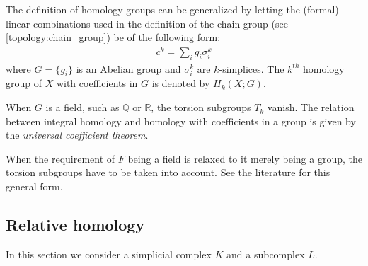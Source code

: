     \begin{construct}
        The definition of homology groups can be generalized by letting the (formal) linear combinations used in the definition of the chain group (see \ref{topology:chain_group}) be of the following form:
        \begin{gather}
            c^k = \sum_ig_i\sigma_i^k
        \end{gather}
        where $G = \{g_i\}$ is an Abelian group and $\sigma_i^k$ are $k$-simplices. The $k^{th}$ homology group of $X$ with coefficients in $G$ is denoted by $H_k(X; G)$.
    \end{construct}
    \begin{property}
        When $G$ is a field, such as $\mathbb{Q}$ or $\mathbb{R}$, the torsion subgroups $T_k$ vanish. The relation between integral homology and homology with coefficients in a group is given by the \textit{universal coefficient theorem}.
    \end{property}

    \begin{remark*}
        When the requirement of $F$ being a field is relaxed to it merely being a group, the torsion subgroups have to be taken into account. See the literature for this general form.
    \end{remark*}

\subsection{Relative homology}

    In this section we consider a simplicial complex $K$ and a subcomplex $L$.

